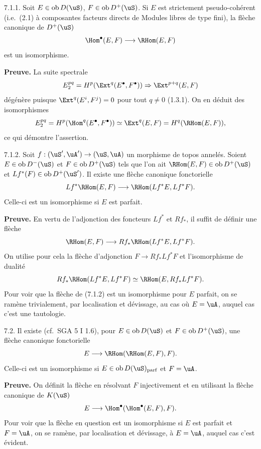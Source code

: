 \begin{lemme} 7.1.1.
Soit $E \in \operatorname{ob} D(\uS)$, $F \in \operatorname{ob} D^+(\uS)$. Si $E$ est strictement pseudo-coh\'{e}rent (i.e.~(2.1) \`{a} composantes facteurs directs de Modules libres de type fini), la fl\`{e}che canonique de $D^+(\uS)$
\[
\Hom^{\bullet}(E,F) \longrightarrow \RHom(E,F)
\]
est un isomorphisme.
\end{lemme}

\noindent\textbf{Preuve.} La suite spectrale
\[
E_2^{pq} = H^p(\Ext^q(E^{\bullet},F^{\bullet})) \Rightarrow \Ext^{p+q}(E,F)
\]
d\'{e}g\'{e}n\`{e}re puisque $\Ext^q(E^i,F^j) = 0$ pour tout $q \neq 0$ (1.3.1). On en d\'{e}duit des isomorphismes
\[
E_2^{pq} = H^p(\Hom^q(E^{\bullet},F^{\bullet})) \simeq \Ext^q(E,F) = H^q(\RHom(E,F)) ,
\]
ce qui d\'{e}montre l'assertion.

\begin{proposition} 7.1.2.
Soit $f : (\uS',\uA') \rightarrow (\uS,\uA)$ un morphisme de topos annel\'{e}s. Soient $E \in \operatorname{ob} D^-(\uS)$ et $F \in \operatorname{ob} D^+(\uS)$ tels que l'on ait $\RHom(E,F) \in \operatorname{ob} D^+(\uS)$ et $Lf^*(F) \in \operatorname{ob} D^+(\uS')$. Il existe une fl\`{e}che canonique fonctorielle
\[
Lf^* \RHom(E,F) \longrightarrow \RHom(Lf^*E, Lf^*F) .
\]
Celle-ci est un isomorphisme si $E$ est parfait.
\end{proposition}

\noindent\textbf{Preuve.} En vertu de l'adjonction des foncteurs $Lf^*$ et $Rf_*$, il suffit de d\'{e}finir une fl\`{e}che
\[
\RHom(E,F) \longrightarrow Rf_* \RHom(Lf^*E, Lf^*F) .
\]
On utilise pour cela la fl\`{e}che d'adjonction $F \rightarrow Rf_* Lf^*F$ et l'isomorphisme de dualit\'{e}
\[
Rf_* \RHom(Lf^*E, Lf^*F) \simeq \RHom(E, Rf_* Lf^*F) .
\]
Pour voir que la fl\`{e}che de (7.1.2) est un isomorphisme pour $E$ parfait, on se ram\`{e}ne trivialement, par localisation et d\'{e}vissage, au cas o\`{u} $E = \uA$, auquel cas c'est une tautologie.

\begin{proposition} 7.2.
Il existe (cf.~SGA 5 I 1.6), pour $E \in \operatorname{ob} D(\uS)$ et $F \in \operatorname{ob} D^+(\uS)$, une fl\`{e}che canonique fonctorielle
\[
E \longrightarrow \RHom(\RHom(E,F),F) .
\]
Celle-ci est un isomorphisme si $E \in \operatorname{ob} D(\uS)_{\mathrm{parf}}$ et $F = \uA$.
\end{proposition}

\noindent\textbf{Preuve.} On d\'{e}finit la fl\`{e}che en r\'{e}solvant $F$ injectivement et en utilisant la fl\`{e}che canonique de $K(\uS)$
\[
E \longrightarrow \Hom^{\bullet}(\Hom^{\bullet}(E,F),F) .
\]
Pour voir que la fl\`{e}che en question est un isomorphisme si $E$ est parfait et $F = \uA$, on se ram\`{e}ne, par localisation et d\'{e}vissage, \`{a} $E = \uA$, auquel cas c'est \'{e}vident.

